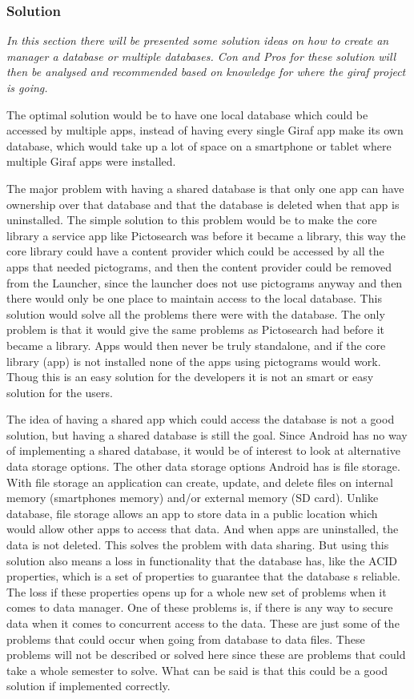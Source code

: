 \subsubsection{Solution}
\textit{In this section there will be presented some solution ideas on how to create an manager a database or multiple databases. Con and Pros for these solution will then be analysed and recommended based on knowledge for where the giraf project is going.}

The optimal solution would be to have one local database which could be accessed by multiple apps, instead of having every single Giraf app make its own database, which would take up a lot of space on a smartphone or tablet where multiple Giraf apps were installed.

The major problem with having a shared database is that only one app can have ownership over that database and that the database is deleted when that app is uninstalled. The simple solution to this problem would be to make the core library a service app like Pictosearch was before it became a library, this way the core library could have a content provider which could be accessed by all the apps that needed pictograms, and then the content provider could be removed from the Launcher, since the launcher does not use pictograms anyway and then there would only be one place to maintain access to the local database. 
This solution would solve all the problems there were with the database. The only problem is that it would give the same problems as Pictosearch had before it became a library. Apps would then never be truly standalone, and if the core library (app) is not installed none of the apps using pictograms would work. Thoug this is an easy solution for the developers it is not an smart or easy solution for the users.

The idea of having a shared app which could access the database is not a good solution, but having a shared database is still the goal. Since Android has no way of implementing a shared database, it would be of interest to look at alternative data storage options. The other data storage options Android has is file storage. With file storage an application can create, update, and delete files on internal memory (smartphones memory) and/or external memory (SD card). Unlike database, file storage allows an app to store data in a public location which would allow other apps to access that data. And when apps are uninstalled, the data is not deleted. This solves the problem with data sharing. But using this solution also means a loss in functionality that the database has, like the ACID properties, which is a set of properties to guarantee that the database s reliable. The loss if these properties opens up for a whole new set of problems when it comes to data manager. One of these problems is, if there is any way to secure data when it comes to concurrent access to the data. These are just some of the problems that could occur when going from database to data files.   
These problems will not be described or solved here since these are problems that could take a whole semester to solve. What can be said is that this could be a good solution if implemented correctly.